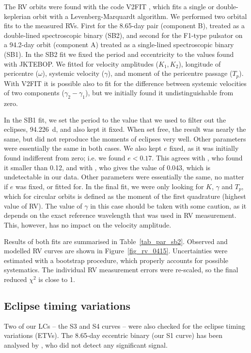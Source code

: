 \documentclass{aa}
\begin{document}
The RV orbits were found with the code V2FIT \citep{kon10}, which fits a
single or double-keplerian orbit with a Levenberg-Marquardt algorithm.
We performed two orbital fits to the measured RVs. First for the 8.65-day
pair (component B), treated as a double-lined spectroscopic binary (SB2), 
and second for the F1-type pulsator on a 94.2-day orbit (component A)
treated as a single-lined spectroscopic binary (SB1).
In the SB2 fit we fixed the period and eccentricity to the values found
with JKTEBOP. We fitted for velocity amplitudes ($K_1,K_2$), longitude
of pericentre ($\omega$), systemic velocity ($\gamma$), and moment of
the pericentre passage ($T_p$). With V2FIT it is possible also to fit
for the difference between systemic velocities of two components 
($\gamma_2-\gamma_1$), but we initially found it undistinguishable from
zero.

In the SB1 fit, we set the period to the value that we used to filter out the 
eclipses, 94.226~d, and also kept it fixed. When set free, the result was nearly
the same, but did not reproduce the moments of eclipses very well. Other 
parameters were essentially the same in both cases. We also kept $e$ fixed, 
as it was initially found indifferent from zero; i.e. we found $e<0.17$. 
This agrees with \citet{shi12}, who found it smaller than 0.12, and with \citet{bal14}, 
who gives the value of 0.043, which is undetectable in our data. Other 
parameters were essentially the same, no matter if $e$ was fixed, or 
fitted for. In the final fit, we were only looking for $K$, $\gamma$ and
$T_p$, which for circular orbits is defined as the moment of the first
quadrature (highest value of RV). The value of $\gamma$ in this case should 
be taken with some caution, as it depends on the exact reference wavelength 
that was used in RV measurement. This, however, has no impact on the velocity 
amplitude.

Results of both fits are summarised in Table~\ref{tab_par_sb2}. Observed and
modelled RV curves are shown in Figure~\ref{fig_rv_0415}. Uncertainties
were estimated with a bootstrap procedure, which properly accounts for
possible systematics. The individual RV measurement errors were re-scaled,
so the final reduced $\chi^2$ is close to 1.

\subsection{Eclipse timing variations}\label{sec_etv}
Two of our LCs -- the S3 and S4 curves -- were also checked for the eclipse 
timing variations (ETVs). The 8.65-day eccentric binary (our S1 curve) has been 
analysed by \citet{bor16}, who did not detect any significant signal.
\end{document}
